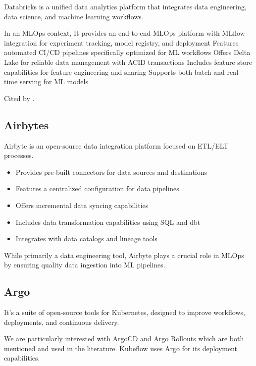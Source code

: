 Databricks is a unified data analytics platform that integrates data engineering, data science, and machine learning workflows.

In an MLOps context, It provides an end-to-end MLOps platform with MLflow integration for experiment tracking, model registry, and deployment
Features automated CI/CD pipelines specifically optimized for ML workflows
Offers Delta Lake for reliable data management with ACID transactions
Includes feature store capabilities for feature engineering and sharing
Supports both batch and real-time serving for ML models

Cited by \cite{mlflow}.

\subsection{Airbytes}
Airbyte is an open-source data integration platform focused on ETL/ELT processes.

\begin{itemize}
\item Provides pre-built connectors for data sources and destinations
\item Features a centralized configuration for data pipelines
\item Offers incremental data syncing capabilities
\item Includes data transformation capabilities using SQL and dbt
\item Integrates with data catalogs and lineage tools
\end{itemize}

While primarily a data engineering tool, Airbyte plays a crucial role in MLOps by ensuring quality data ingestion into ML pipelines.

\subsection{Argo}\label{subsec:argo}\cite{argo}
It's a suite of open-source tools for Kubernetes, designed to improve workflows, deployments, and continuous delivery.

We are particularly interested with ArgoCD and Argo Rollouts which are both mentioned and used in the literature.
Kubeflow uses Argo for its deployment capabilities.

